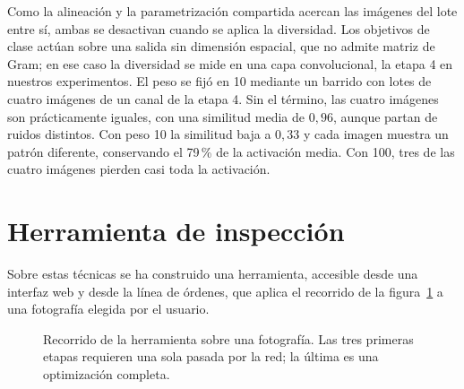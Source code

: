 \documentclass[11pt,a4paper]{article}
\begin{document}
Como la alineación y la parametrización compartida acercan las imágenes del
lote entre sí, ambas se desactivan cuando se aplica la diversidad. Los
objetivos de clase actúan sobre una salida sin dimensión espacial, que no
admite matriz de Gram; en ese caso la diversidad se mide en una capa
convolucional, la etapa 4 en nuestros experimentos. El peso se fijó en 10 mediante un barrido
con lotes de cuatro imágenes de un canal de la etapa 4. Sin el término, las
cuatro imágenes son prácticamente iguales, con una similitud media de
$0{,}96$, aunque partan de ruidos distintos. Con peso 10 la similitud baja a
$0{,}33$ y cada imagen muestra un patrón diferente, conservando el 79\,\% de
la activación media. Con 100, tres de las cuatro imágenes pierden casi toda
la activación.

\section{Herramienta de inspección}
\label{sec:herramienta}

Sobre estas técnicas se ha construido una herramienta, accesible desde una
interfaz web y desde la línea de órdenes, que aplica el recorrido de la
figura~\ref{fig:recorrido} a una fotografía elegida por el usuario.

\begin{figure}[!htb]
\centering
{}
\caption{Recorrido de la herramienta sobre una fotografía. Las tres primeras
etapas requieren una sola pasada por la red; la última es una optimización
completa.}
\label{fig:recorrido}
\end{figure}
\end{document}
